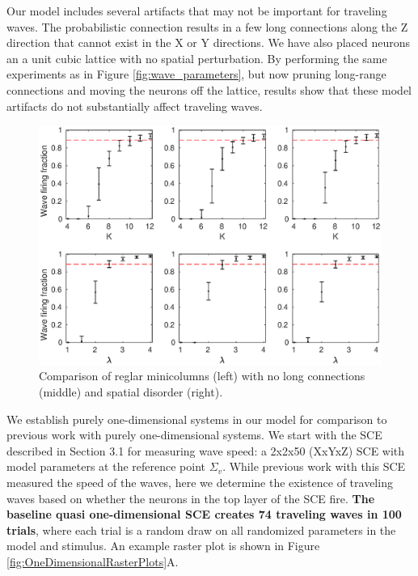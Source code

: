 Our model includes several artifacts that may not be important for traveling waves.
The probabilistic connection results in a few long connections along the Z direction that cannot exist in the X or Y directions.
We have also placed neurons an a unit cubic lattice with no spatial perturbation.
By performing the same experiments as in Figure \ref{fig:wave_parameters}, but now pruning long-range connections and moving the neurons off the lattice, 
results show that these model artifacts do not substantially affect traveling waves.
\begin{figure}[!htb]
 \centering
 \includegraphics[width=\textwidth]{fig/LongConnections_SpatialDisorder}
 \caption{Comparison of reglar minicolumns (left) with no long connections (middle) and spatial disorder (right).  }
 \label{fig:long_connx}
\end{figure}

\FloatBarrier

We establish purely one-dimensional systems in our model for comparison to previous work with purely one-dimensional systems.
We start with the SCE described in Section 3.1 for measuring wave speed: a 2x2x50 (XxYxZ) SCE with model parameters at the reference point $\Sigma_v$. 
While previous work with this SCE measured the speed of the waves, here we determine the existence of traveling waves based on whether the neurons in the top layer of the SCE fire.
\textbf{The baseline quasi one-dimensional SCE creates 74 traveling waves in 100 trials}, where each trial is a random draw on all randomized parameters in the model and stimulus.
An example raster plot is shown in Figure \ref{fig:OneDimensionalRasterPlots}A.


